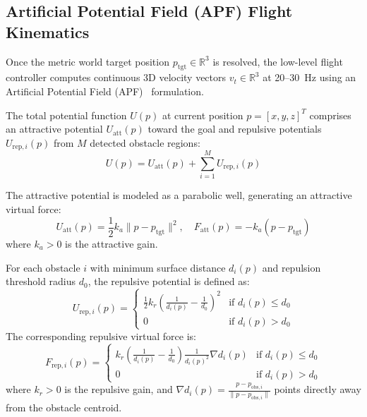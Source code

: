 \documentclass[conference]{IEEEtran}
\begin{document}
\subsection{Artificial Potential Field (APF) Flight Kinematics}
Once the metric world target position $p_{\text{tgt}} \in \mathbb{R}^3$ is resolved, the low-level flight controller computes continuous 3D velocity vectors $v_t \in \mathbb{R}^3$ at 20--30~Hz using an Artificial Potential Field (APF)~\cite{khatib1986apf} formulation.

The total potential function $U(p)$ at current position $p = [x, y, z]^T$ comprises an attractive potential $U_{\text{att}}(p)$ toward the goal and repulsive potentials $U_{\text{rep}, i}(p)$ from $M$ detected obstacle regions:
\begin{equation}
    U(p) = U_{\text{att}}(p) + \sum_{i=1}^M U_{\text{rep}, i}(p)
\end{equation}

The attractive potential is modeled as a parabolic well, generating an attractive virtual force:
\begin{equation}
    U_{\text{att}}(p) = \frac{1}{2} k_a \| p - p_{\text{tgt}} \|^2, \quad F_{\text{att}}(p) = -k_a (p - p_{\text{tgt}})
\end{equation}
where $k_a > 0$ is the attractive gain.

For each obstacle $i$ with minimum surface distance $d_i(p)$ and repulsion threshold radius $d_0$, the repulsive potential is defined as:
\begin{equation}
    U_{\text{rep}, i}(p) = \begin{cases}
        \frac{1}{2} k_r \left( \frac{1}{d_i(p)} - \frac{1}{d_0} \right)^2 & \text{if } d_i(p) \le d_0 \\
        0 & \text{if } d_i(p) > d_0
    \end{cases}
\end{equation}
The corresponding repulsive virtual force is:
\begin{equation}
    F_{\text{rep}, i}(p) = \begin{cases}
        k_r \left( \frac{1}{d_i(p)} - \frac{1}{d_0} \right) \frac{1}{d_i(p)^2} \nabla d_i(p) & \text{if } d_i(p) \le d_0 \\
        0 & \text{if } d_i(p) > d_0
    \end{cases}
\end{equation}
where $k_r > 0$ is the repulsive gain, and $\nabla d_i(p) = \frac{p - p_{\text{obs}, i}}{\| p - p_{\text{obs}, i} \|}$ points directly away from the obstacle centroid.
\end{document}

